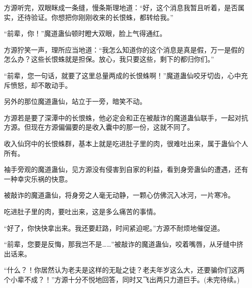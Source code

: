 \begin{this_body}
方源听完，双眼眯成一条缝，慢条斯理地道：“好，这个消息我暂且听着，是否属实，还待验证。你想把你刚刚收来的长恨蛛，都转给我。”

“前辈，你！”魔道蛊仙顿时瞪大双眼，脸上气得通红。

方源狞笑一声，理所应当地道：“我怎么知道你的这个消息是真是假，万一是假的怎么办？这些长恨蛛就是担保。放心，我只要这些，剩下的都归你们。”

“前辈，您一句话，就要了这里总量两成的长恨蛛啊！”魔道蛊仙咬牙切齿，心中充斥愤怒，却不敢动手。

另外的那位魔道蛊仙，站立于一旁，暗笑不动。

方源若是要了深潭中的长恨蛛，他必定会和正在被敲诈的魔道蛊仙联手，一起对抗方源。但现在方源偏偏要的是收入囊中的那一份，这就不同了。

收入仙窍中的长恨蛛群，基本上就是吃进肚子里的肉，很难吐出来，属于蛊仙个人所有。

袖手旁观的魔道蛊仙，见方源没有侵害到自家的利益，看到身旁蛊仙的遭遇，还有一种幸灾乐祸的快意。

被敲诈的魔道蛊仙，将身旁之人毫无动静，一颗心仿佛沉入冰河，一片寒冷。

吃进肚子里的肉，要吐出来，这是多么痛苦的事情。

“好了，你快快拿出来。我还要赶路，时间紧迫呢。”方源不耐烦地催促道。

“前辈，您要是反悔，那我岂不是……”被敲诈的魔道蛊仙，咬着嘴唇，从牙缝中挤出话来。

“什么？！你居然认为老夫是这样的无耻之徒？老夫年岁这么大，还要骗你们这两个小辈不成？！”方源十分不悦地回答，同时又飞出两只力道巨手。(未完待续。)

\end{this_body}

